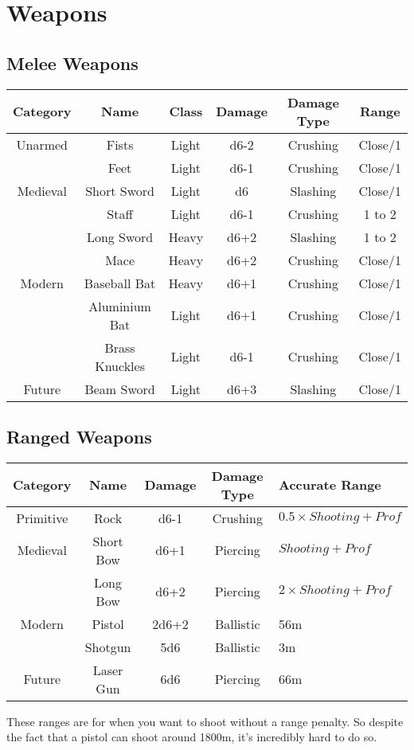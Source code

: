 \section{Weapons} \label{sec:weapons}
\subsection{Melee Weapons}
\begin{center}
\begin{tabular}{c|c|c|c|c|c}
    \textbf{Category} & \textbf{Name} & \textbf{Class} & \textbf{Damage} & \textbf{Damage Type} & \textbf{Range} \\\hline
    Unarmed  & Fists          & Light & d6-2 & Crushing & Close/1\\
             & Feet           & Light & d6-1 & Crushing & Close/1\\\hline
    Medieval & Short Sword    & Light & d6   & Slashing & Close/1\\
             & Staff          & Light & d6-1 & Crushing & 1 to 2 \\
             & Long Sword     & Heavy & d6+2 & Slashing & 1 to 2 \\
             & Mace           & Heavy & d6+2 & Crushing & Close/1\\\hline
    Modern   & Baseball Bat   & Heavy & d6+1 & Crushing & Close/1\\
             & Aluminium Bat  & Light & d6+1 & Crushing & Close/1\\
             & Brass Knuckles & Light & d6-1 & Crushing & Close/1\\\hline
    Future   & Beam Sword     & Light & d6+3 & Slashing & Close/1
\end{tabular}
\end{center}

\subsection{Ranged Weapons}
\begin{center}
\begin{tabular}{c|c|c|c|l}
    \textbf{Category} & \textbf{Name} & \textbf{Damage} & \textbf{Damage Type} & \textbf{Accurate Range} \\\hline
    Primitive & Rock        & d6-1  & Crushing & $0.5 \times Shooting + Prof$  \\\hline
    Medieval  & Short Bow   & d6+1  & Piercing & $Shooting + Prof$ \\
              & Long Bow    & d6+2  & Piercing & $2 \times Shooting + Prof$ \\\hline
    Modern    & Pistol      & 2d6+2 & Ballistic & 56m \\
              & Shotgun     & 5d6   & Ballistic & 3m \\\hline
    Future    & Laser Gun   & 6d6   & Piercing & 66m \\
\end{tabular}
\end{center}
\note These ranges are for when you want to shoot without a range penalty.
So despite the fact that a pistol can shoot around 1800m, it's incredibly hard to do so.

